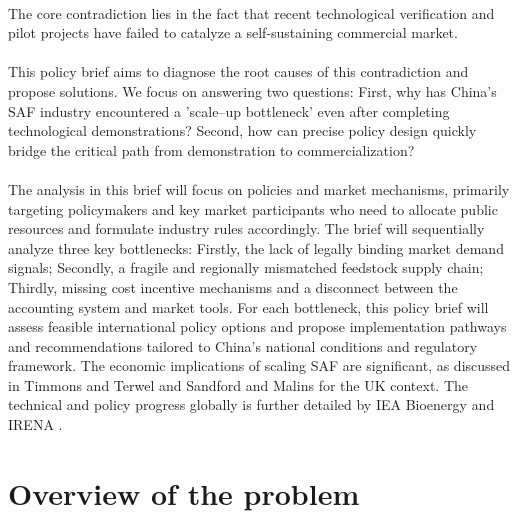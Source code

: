 \documentclass[a4paper,11pt]{article}
\begin{document}
\\
The core contradiction lies in the fact that recent technological verification and pilot projects have failed to catalyze a self-sustaining commercial market.\\
\\
This policy brief aims to diagnose the root causes of this contradiction and propose solutions. We focus on answering two questions: First, why has China's SAF industry encountered a 'scale--up bottleneck' even after completing technological demonstrations? Second, how can precise policy design quickly bridge the critical path from demonstration to commercialization?\\
\\
The analysis in this brief will focus on policies and market mechanisms, primarily targeting policymakers and key market participants who need to allocate public resources and formulate industry rules accordingly. The brief will sequentially analyze three key bottlenecks: Firstly, the lack of legally binding market demand signals; Secondly, a fragile and regionally mismatched feedstock supply chain; Thirdly, missing cost incentive mechanisms and a disconnect between the accounting system and market tools. For each bottleneck, this policy brief will assess feasible international policy options and propose implementation pathways and recommendations tailored to China's national conditions and regulatory framework. The economic implications of scaling SAF are significant, as discussed in Timmons and Terwel \cite{timmons2022} and Sandford and Malins \cite{sandford2024} for the UK context. The technical and policy progress globally is further detailed by IEA Bioenergy \cite{iea2024} and IRENA \cite{irena2024}.

\section{Overview of the problem}
\end{document}
